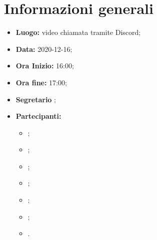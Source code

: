 \section{Informazioni generali}
	\begin{itemize}
		\item \textbf{Luogo:} video chiamata tramite Discord;
		\item \textbf{Data:} 2020-12-16;
		\item \textbf{Ora Inizio:} 16:00;
		\item \textbf{Ora fine:} 17:00;
		\item \textbf{Segretario} \FD;
		\item \textbf{Partecipanti:}
		\begin{itemize}
			\item \MB;
			\item \VAS;
			\item \FD;
			\item \NM;
			\item \SB;
			\item \GB;
			\item \MDI.
		\end{itemize}
		
	\end{itemize}